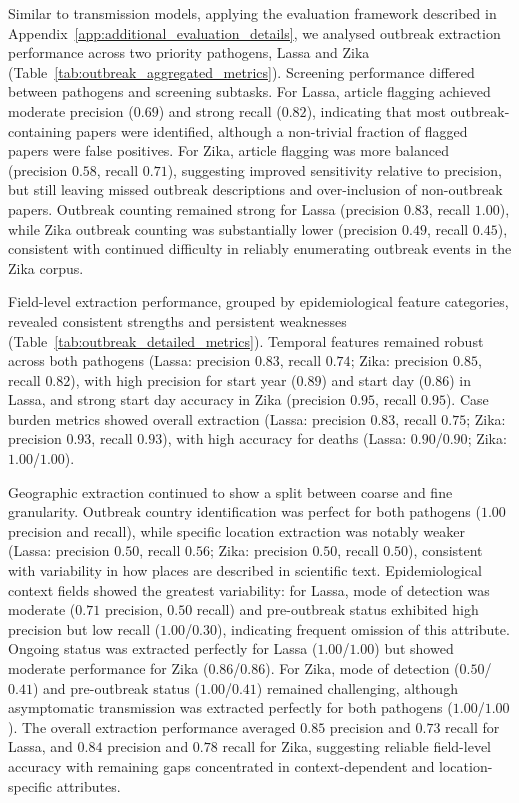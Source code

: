Similar to transmission models, applying the evaluation framework described in Appendix~\ref{app:additional_evaluation_details}, we analysed outbreak extraction performance across two priority pathogens, Lassa and Zika (Table~\ref{tab:outbreak_aggregated_metrics}). Screening performance differed between pathogens and screening subtasks. For Lassa, article flagging achieved moderate precision ($0.69$) and strong recall ($0.82$), indicating that most outbreak-containing papers were identified, although a non-trivial fraction of flagged papers were false positives. For Zika, article flagging was more balanced (precision $0.58$, recall $0.71$), suggesting improved sensitivity relative to precision, but still leaving missed outbreak descriptions and over-inclusion of non-outbreak papers. Outbreak counting remained strong for Lassa (precision $0.83$, recall $1.00$), while Zika outbreak counting was substantially lower (precision $0.49$, recall $0.45$), consistent with continued difficulty in reliably enumerating outbreak events in the Zika corpus.


Field-level extraction performance, grouped by epidemiological feature categories, revealed consistent strengths and persistent weaknesses (Table~\ref{tab:outbreak_detailed_metrics}). Temporal features remained robust across both pathogens (Lassa: precision $0.83$, recall $0.74$; Zika: precision $0.85$, recall $0.82$), with high precision for start year ($0.89$) and start day ($0.86$) in Lassa, and strong start day accuracy in Zika (precision $0.95$, recall $0.95$). Case burden metrics showed overall extraction (Lassa: precision $0.83$, recall $0.75$; Zika: precision $0.93$, recall $0.93$), with high accuracy for deaths (Lassa: $0.90$/$0.90$; Zika: $1.00$/$1.00$).

Geographic extraction continued to show a split between coarse and fine granularity. Outbreak country identification was perfect for both pathogens ($1.00$ precision and recall), while specific location extraction was notably weaker (Lassa: precision $0.50$, recall $0.56$; Zika: precision $0.50$, recall $0.50$), consistent with variability in how places are described in scientific text. Epidemiological context fields showed the greatest variability: for Lassa, mode of detection was moderate ($0.71$ precision, $0.50$ recall) and pre-outbreak status exhibited high precision but low recall ($1.00$/$0.30$), indicating frequent omission of this attribute. Ongoing status was extracted perfectly for Lassa ($1.00$/$1.00$) but showed moderate performance for Zika ($0.86$/$0.86$). For Zika, mode of detection ($0.50$/$0.41$) and pre-outbreak status ($1.00$/$0.41$) remained challenging, although asymptomatic transmission was extracted perfectly for both pathogens ($1.00$/$1.00$). The overall extraction performance averaged $0.85$ precision and $0.73$ recall for Lassa, and $0.84$ precision and $0.78$ recall for Zika, suggesting reliable field-level accuracy with remaining gaps concentrated in context-dependent and location-specific attributes.


\clearpage